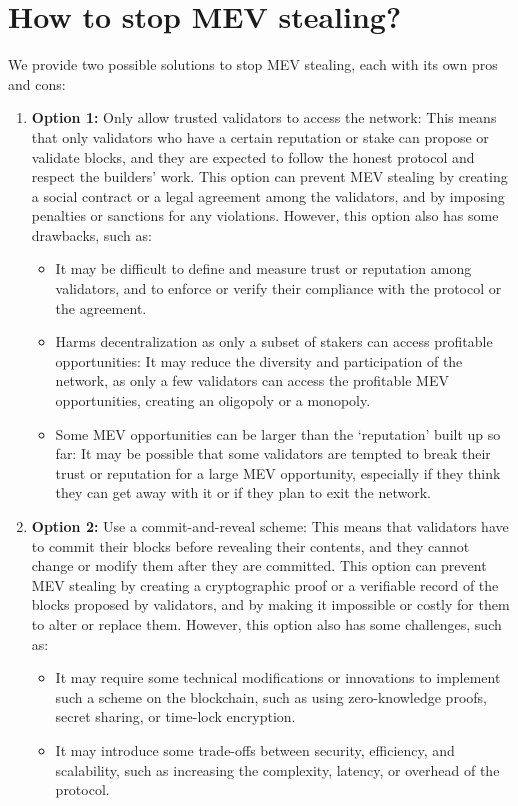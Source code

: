 \documentclass{report}
\begin{document}
\section{How to stop MEV stealing?}
We provide two possible solutions to stop MEV stealing, each with its own pros and cons:
\begin{enumerate}
	\item \textbf{Option 1:} Only allow trusted validators to access the network: This means that only validators who have a certain reputation or stake can propose or validate blocks, and they are expected to follow the honest protocol and respect the builders’ work. This option can prevent MEV stealing by creating a social contract or a legal agreement among the validators, and by imposing penalties or sanctions for any violations. However, this option also has some drawbacks, such as:
	\begin{itemize}
		\item It may be difficult to define and measure trust or reputation among validators, and to enforce or verify their compliance with the protocol or the agreement.
		\item Harms decentralization as only a subset of stakers can access profitable opportunities: It may reduce the diversity and participation of the network, as only a few validators can access the profitable MEV opportunities, creating an oligopoly or a monopoly.
		\item Some MEV opportunities can be larger than the ‘reputation’ built up so far: It may be possible that some validators are tempted to break their trust or reputation for a large MEV opportunity, especially if they think they can get away with it or if they plan to exit the network.
	\end{itemize}
	\item \textbf{Option 2:} Use a commit-and-reveal scheme: This means that validators have to commit their blocks before revealing their contents, and they cannot change or modify them after they are committed. This option can prevent MEV stealing by creating a cryptographic proof or a verifiable record of the blocks proposed by validators, and by making it impossible or costly for them to alter or replace them. However, this option also has some challenges, such as:
	\begin{itemize}
		\item It may require some technical modifications or innovations to implement such a scheme on the blockchain, such as using zero-knowledge proofs, secret sharing, or time-lock encryption.
		\item It may introduce some trade-offs between security, efficiency, and scalability, such as increasing the complexity, latency, or overhead of the protocol.
	\end{itemize}
\end{enumerate}
\end{document}
